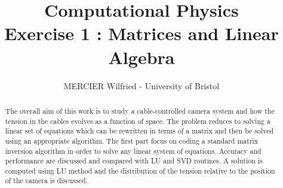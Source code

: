 \documentclass[10 pt]{article}
\begin{document}
\title{\LARGE \bf Computational Physics \\ Exercise 1 : Matrices and Linear Algebra }
\author{MERCIER Wilfried  -  University of Bristol}

\maketitle


\begin{abstract}

The overall aim of this work is to study a cable-controlled camera system and how the tension in the cables evolves as a function of space. The problem reduces to solving a linear set of equations which can be rewritten in terms of a matrix and then be solved 
using an appropriate algorithm. The first part focus on coding a standard matrix inversion algorithm in order to solve any linear system of equations. Accuracy and performance are discussed and compared with LU and SVD routines.
A solution is computed using LU method and the distribution of the tension relative to the position of the camera is discussed.

\end{abstract}
\end{document}
